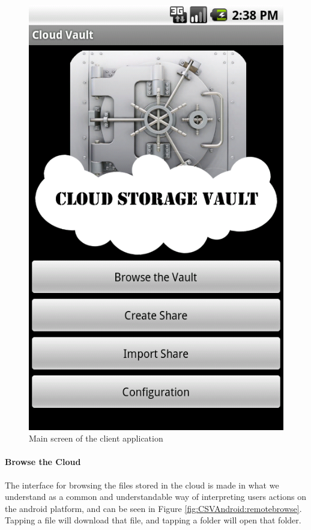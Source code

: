 \documentclass[pdftex,english,10pt,b5paper,twoside]{book}
\begin{document}
\begin{figure}[h!]
    \centering
    \includegraphics[scale=0.4]{client-mainscreen.png}
    \caption{Main screen of the client application}
    \label{fig:CSVAndroid:mainscreen}
\end{figure}

\paragraph{Browse the Cloud}

The interface for browsing the files stored in the cloud is made in what we
understand as a common and understandable way of interpreting users actions on
the android platform, and can be seen in Figure
\ref{fig:CSVAndroid:remotebrowse}. Tapping a file will download that file, and
tapping a folder will open that folder.
\end{document}
